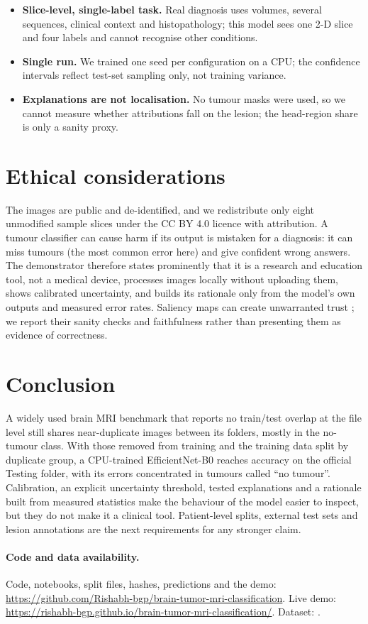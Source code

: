\documentclass[11pt,a4paper]{article}
\begin{document}
\begin{itemize}
\item \textbf{Slice-level, single-label task.} Real diagnosis uses volumes, several sequences, clinical context and histopathology; this model sees one 2-D slice and four labels and cannot recognise other conditions.
\item \textbf{Single run.} We trained one seed per configuration on a CPU; the confidence intervals reflect test-set sampling only, not training variance.
\item \textbf{Explanations are not localisation.} No tumour masks were used, so we cannot measure whether attributions fall on the lesion; the head-region share is only a sanity proxy.
\end{itemize}

\section{Ethical considerations}
The images are public and de-identified, and we redistribute only eight unmodified sample slices under the CC BY 4.0 licence with attribution. A tumour classifier can cause harm if its output is mistaken for a diagnosis: it can miss tumours (the most common error here) and give confident wrong answers. The demonstrator therefore states prominently that it is a research and education tool, not a medical device, processes images locally without uploading them, shows calibrated uncertainty, and builds its rationale only from the model's own outputs and measured error rates. Saliency maps can create unwarranted trust \citep{adebayo2018,arun2021}; we report their sanity checks and faithfulness rather than presenting them as evidence of correctness.

\section{Conclusion}
A widely used brain MRI benchmark that reports no train/test overlap at the file level still shares near-duplicate images between its folders, mostly in the no-tumour class. With those removed from training and the training data split by duplicate group, a CPU-trained EfficientNet-B0 reaches \AccCFull{} accuracy on the official Testing folder, with its errors concentrated in tumours called ``no tumour''. Calibration, an explicit uncertainty threshold, tested explanations and a rationale built from measured statistics make the behaviour of the model easier to inspect, but they do not make it a clinical tool. Patient-level splits, external test sets and lesion annotations are the next requirements for any stronger claim.

\paragraph{Code and data availability.} Code, notebooks, split files, hashes, predictions and the demo: \url{https://github.com/Rishabh-bgp/brain-tumor-mri-classification}. Live demo: \url{https://rishabh-bgp.github.io/brain-tumor-mri-classification/}. Dataset: \citet{nickparvar2021}.



\end{document}
